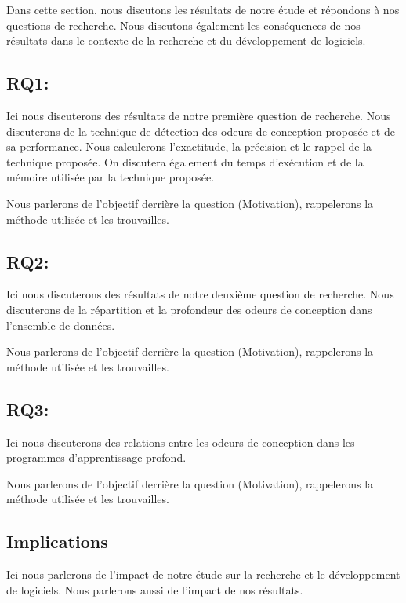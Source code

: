 \label{discussion}
Dans cette section, nous discutons les résultats de notre étude et répondons à
nos questions de recherche. Nous discutons également les conséquences de nos
résultats dans le contexte de la recherche et du développement de logiciels.

\subsection{RQ1:\RQOne}
\label{rq1}

Ici nous discuterons des résultats de notre première question de recherche. Nous
discuterons de la technique de détection des odeurs de conception proposée et de
sa performance. Nous calculerons l'exactitude, la précision et le rappel de la technique
proposée. On discutera également du temps d'exécution et de la mémoire utilisée
par la technique proposée.

Nous parlerons de l'objectif derrière la question (Motivation), rappelerons la
méthode utilisée et les trouvailles.





\subsection{RQ2:\RQTwo}
\label{rq2}

Ici nous discuterons des résultats de notre deuxième question de recherche. Nous
discuterons de la répartition et la profondeur des odeurs de conception dans
l'ensemble de données.


Nous parlerons de l'objectif derrière la question (Motivation), rappelerons la
méthode utilisée et les trouvailles.



\subsection{RQ3:\RQThree}
\label{rq3}

Ici nous discuterons des relations entre les odeurs de conception dans les
programmes d'apprentissage profond.

Nous parlerons de l'objectif derrière la question (Motivation), rappelerons la
méthode utilisée et les trouvailles.






\subsection{Implications}
\label{implications}
Ici nous parlerons de l'impact de notre étude sur la recherche et le
développement de logiciels. Nous parlerons aussi de l'impact de nos résultats.




